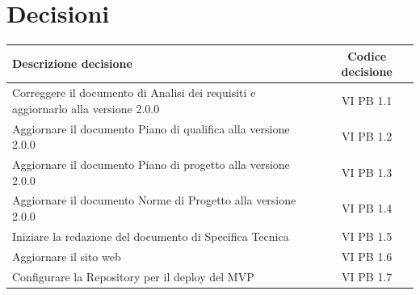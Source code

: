 \documentclass[a4paper,12pt]{article}
\newcommand{\ignoreglossary}{}
\begin{document}
\section{Decisioni}
\begin{center}
\small
\renewcommand{\arraystretch}{1.2} 
\begin{tabular}{|p{}|c|}
\hline
\rowcolor{gray!60} 
\textbf{Descrizione decisione} & \textbf{Codice decisione} \\
\hline
\rowcolor{white}
Correggere il documento di Analisi dei requisiti e aggiornarlo alla versione 2.0.0 & VI \ignoreglossary{PB} 1.1 \\
\hline
\rowcolor{gray!20}
Aggiornare il documento Piano di qualifica alla versione 2.0.0 & VI \ignoreglossary{PB} 1.2 \\
\hline
\rowcolor{white}
Aggiornare il documento Piano di progetto alla versione 2.0.0 & VI \ignoreglossary{PB} 1.3 \\
\hline
\rowcolor{gray!20}
Aggiornare il documento Norme di Progetto alla versione 2.0.0 & VI \ignoreglossary{PB} 1.4 \\
\hline
\rowcolor{white}
Iniziare la redazione del documento di Specifica Tecnica & VI \ignoreglossary{PB} 1.5 \\
\hline
\rowcolor{gray!20}
Aggiornare il sito web & VI \ignoreglossary{PB} 1.6 \\
\hline
\rowcolor{white}
Configurare la Repository per il deploy del MVP & VI \ignoreglossary{PB} 1.7 \\
\hline
\end{tabular}
\end{center}
\pagebreak
\end{document}
